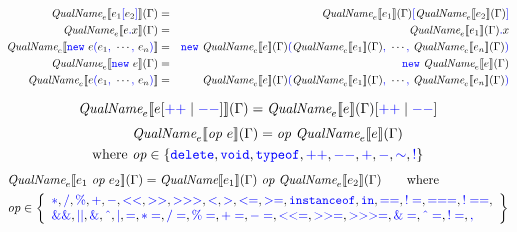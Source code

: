 \documentclass[a4paper]{article}
\newcommand{\code}[1]{\textcolor{blue}{\tt #1}}
\newcommand{\Where}{\mbox{where}}
\newcommand{\QualName}{\emph{QualName}}
\newcommand{\caret}{\mathbin{\char`\^}}
\begin{document}
\begin{eqnarray*}
\QualName_e \llbracket e_1\code{[}e_2\code{]} \rrbracket (\Gamma) & = & \QualName_e \llbracket e_1 \rrbracket (\Gamma)\code{[}\QualName_e \llbracket e_2 \rrbracket (\Gamma)\code{]} \\
\QualName_e \llbracket e\code{.}x \rrbracket (\Gamma) & = & \QualName_e \llbracket e_1 \rrbracket (\Gamma)\code{.}x \\
\QualName_e \llbracket \code{new}\ e\code{(}e_1\code{,}\ \cdots\code{,}\ e_n\code{)} \rrbracket & = & \code{new}\ \QualName_e \llbracket e \rrbracket (\Gamma)\code{(}\QualName_e \llbracket e_1 \rrbracket (\Gamma)\code{,}\ \cdots\code{,}\ \QualName_e \llbracket e_n \rrbracket (\Gamma)\code{)} \\
\QualName_e \llbracket \code{new}\ e \rrbracket (\Gamma) & = & \code{new}\ \QualName_e \llbracket e \rrbracket (\Gamma) \\
\QualName_e \llbracket e\code{(}e_1\code{,}\ \cdots\code{,}\ e_n\code{)} \rrbracket & = & \QualName_e \llbracket e \rrbracket (\Gamma)\code{(}\QualName_e \llbracket e_1 \rrbracket (\Gamma)\code{,}\ \cdots\code{,}\ \QualName_e \llbracket e_n \rrbracket (\Gamma)\code{)}
\end{eqnarray*}

\begin{equation*}
\QualName_e \llbracket e[\code{++}\mid\code{--}] \rrbracket (\Gamma) = \QualName_e \llbracket e \rrbracket (\Gamma)[\code{++}\mid\code{--}]
\end{equation*}
\begin{equation*}
\begin{split}
&\QualName_e \llbracket \emph{op}\ e \rrbracket (\Gamma) = \emph{op}\ \QualName_e \llbracket e \rrbracket (\Gamma) \\
\Where\ &\emph{op} \in \{\code{delete}, \code{void}, \code{typeof}, \code{++}, \code{--}, \code{+}, \code{-}, \code{\sim}, \code{!}\}
\end{split}
\end{equation*}
\begin{equation*}
\begin{split}
&\QualName_e \llbracket e_1\ \emph{op}\ e_2 \rrbracket (\Gamma) = \QualName \llbracket e_1 \rrbracket (\Gamma)\ \emph{op}\ \QualName_e \llbracket e_2 \rrbracket (\Gamma) \qquad\Where\\
&\emph{op} \in \left\{\begin{array}{l}
\code{*}, \code{/}, \code{\%}, \code{+}, \code{-}, \code{<<}, \code{>>}, \code{>>>}, \code{<}, \code{>}, \code{<=}, \code{>=}, \code{instanceof}, \code{in}, \code{==}, \code{!=}, \code{===}, \code{!==}, \\
\code{\&\&}, \code{\mid\mid}, \code{\&}, \code{\caret}, \code{\mid}, \code{=}, \code{*=}, \code{/=}, \code{\%=}, \code{+=}, \code{-=}, \code{<<=}, \code{>>=}, \code{>>>=}, \code{\&=}, \code{\caret=}, \code{!=}, \code{,}
\end{array}\right\}
\end{split}
\end{equation*}
\end{document}
